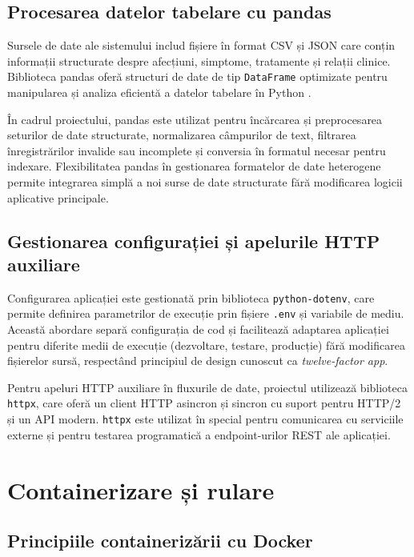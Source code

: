 \documentclass[12pt, a4paper, oneside, romanian]{teza-upb}
\begin{document}
\subsection{Procesarea datelor tabelare cu pandas}

Sursele de date ale sistemului includ fișiere în format CSV și JSON care conțin informații structurate despre afecțiuni, simptome, tratamente și relații clinice. Biblioteca pandas oferă structuri de date de tip \texttt{DataFrame} optimizate pentru manipularea și analiza eficientă a datelor tabelare în Python \cite{pandas_doc}.

În cadrul proiectului, pandas este utilizat pentru încărcarea și preprocesarea seturilor de date structurate, normalizarea câmpurilor de text, filtrarea înregistrărilor invalide sau incomplete și conversia în formatul necesar pentru indexare. Flexibilitatea pandas în gestionarea formatelor de date heterogene permite integrarea simplă a noi surse de date structurate fără modificarea logicii aplicative principale.

\subsection{Gestionarea configurației și apelurile HTTP auxiliare}

Configurarea aplicației este gestionată prin biblioteca \texttt{python-dotenv}, care permite definirea parametrilor de execuție prin fișiere \texttt{.env} și variabile de mediu. Această abordare separă configurația de cod și facilitează adaptarea aplicației pentru diferite medii de execuție (dezvoltare, testare, producție) fără modificarea fișierelor sursă, respectând principiul de design cunoscut ca \textit{twelve-factor app}.

Pentru apeluri HTTP auxiliare în fluxurile de date, proiectul utilizează biblioteca \texttt{httpx}, care oferă un client HTTP asincron și sincron cu suport pentru HTTP/2 și un API modern. \texttt{httpx} este utilizat în special pentru comunicarea cu serviciile externe și pentru testarea programatică a endpoint-urilor REST ale aplicației.

\section{Containerizare și rulare}

\subsection{Principiile containerizării cu Docker}
\end{document}
